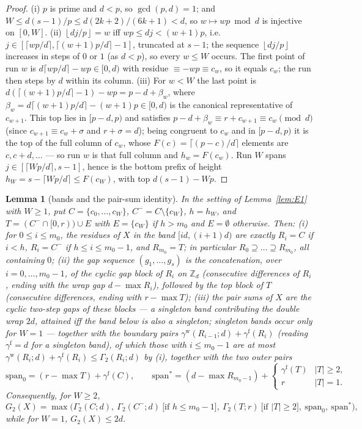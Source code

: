 \documentclass[11pt,a4paper]{article}
\numberwithin{equation}{section}
\theoremstyle{plain}
\theoremstyle{plain}
\newtheorem{lemma}[theorem]{Lemma}
\theoremstyle{definition}
\theoremstyle{remark}
\newcommand{\Z}{\mathbb{Z}}
\newcommand{\floor}[1]{\left\lfloor #1 \right\rfloor}
\begin{document}
\begin{proof}
(i) $p$ is prime and $d<p$, so $\gcd(p,d)=1$; and
$W\le d(s-1)/p\le d(2k+2)/(6k+1)<d$, so $w\mapsto wp\bmod d$ is
injective on $[0,W]$. (ii) $\floor{dj/p}=w$ iff $wp\le dj<(w+1)p$, i.e.\
$j\in[\lceil wp/d\rceil,\lceil(w+1)p/d\rceil-1]$, truncated at $s-1$;
the sequence $\floor{dj/p}$ increases in steps of $0$ or $1$ (as $d<p$),
so every $w\le W$ occurs. The first point of run $w$ is
$d\lceil wp/d\rceil-wp\in[0,d)$ with residue $\equiv-wp\equiv c_w$, so
it equals $c_w$; the run then steps by $d$ within its column. (iii) For
$w<W$ the last point is
$d(\lceil(w{+}1)p/d\rceil-1)-wp=p-d+\beta_w$, where
$\beta_w=d\lceil(w{+}1)p/d\rceil-(w{+}1)p\in[0,d)$ is the canonical
representative of $c_{w+1}$. This top lies in $[p-d,p)$ and satisfies
$p-d+\beta_w\equiv r+c_{w+1}\equiv c_w\pmod d$ (since
$c_{w+1}\equiv c_w+\sigma$ and $r+\sigma=d$); being congruent to $c_w$
and in $[p-d,p)$ it is the top of the full column of $c_w$, whose
$F(c)=\lceil(p-c)/d\rceil$ elements are $c,c+d,\dots$ --- so run $w$ is
that full column and $h_w=F(c_w)$. Run $W$ spans
$j\in[\lceil Wp/d\rceil,s-1]$, hence is the bottom prefix of height
$h_W=s-\lceil Wp/d\rceil\le F(c_W)$, with top $d(s-1)-Wp$.
\end{proof}

\begin{lemma}[bands and the pair-sum identity]\label{lem:E2}
In the setting of Lemma~\ref{lem:E1} with $W\ge1$, put
$C=\{c_0,\dots,c_W\}$, $C^-=C\setminus\{c_W\}$, $h=h_W$, and
$T=(C^-\cap[0,r))\cup E$ with $E=\{c_W\}$ if $h>m_0$ and $E=\emptyset$
otherwise. Then:
\textup{(i)} for $0\le i\le m_0$, the residues of $X$ in the band
$[id,(i{+}1)d)$ are exactly $R_i=C$ if $i<h$, $R_i=C^-$ if
$h\le i\le m_0-1$, and $R_{m_0}=T$; in particular
$R_0\supseteq\dots\supseteq R_{m_0}$, all containing $0$;
\textup{(ii)} the gap sequence $(g_1,\dots,g_s)$ is the concatenation,
over $i=0,\dots,m_0-1$, of the cyclic gap block of $R_i$ on $\Z_d$
(consecutive differences of $R_i$, ending with the wrap gap
$d-\max R_i$), followed by the top block of $T$ (consecutive
differences, ending with $r-\max T$);
\textup{(iii)} the pair sums of $X$ are the cyclic two-step gaps of
these blocks --- a singleton band contributing the double wrap $2d$,
attained iff the band below is also a singleton; singleton bands occur
only for $W=1$ --- together with the boundary pairs
$\gamma^{\mathrm w}(R_{i-1};d)+\gamma^{\mathrm f}(R_i)$ (reading
$\gamma^{\mathrm f}=d$ for a singleton band), of which those with
$i\le m_0-1$ are at most $\gamma^{\mathrm w}(R_i;d)+\gamma^{\mathrm
f}(R_i)\le\Gamma_2(R_i;d)$ by (i), together with the two outer pairs
\[
\mathrm{span}_0=(r-\max T)+\gamma^{\mathrm f}(C),\qquad
\mathrm{span}^\ast=(d-\max R_{m_0-1})+\begin{cases}
\gamma^{\mathrm f}(T)&|T|\ge2,\\ r&|T|=1.\end{cases}
\]
Consequently, for $W\ge2$,
\[
G_2(X)=\max\bigl(\Gamma_2(C;d),\ \Gamma_2(C^-;d)\ \text{[if $h\le
m_0-1$]},\ \Gamma_2(T;r)\ \text{[if $|T|\ge2$]},\
\mathrm{span}_0,\ \mathrm{span}^\ast\bigr),
\]
while for $W=1$, $G_2(X)\le2d$.
\end{lemma}
\end{document}
